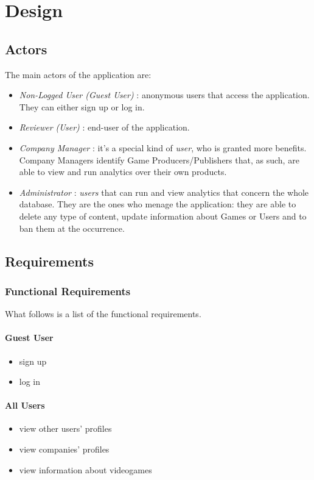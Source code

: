 \chapter{Design}
\section{Actors}
The main actors of the application are: 
\begin{itemize}
	\item \emph{Non-Logged User (Guest User)} : anonymous users that access the application. They can either sign up or log in.
	\item \emph{Reviewer (User)} : end-user of the application.
	\item \emph{Company Manager} : it's a special kind of \emph{user}, who is granted more benefits. Company Managers identify Game Producers/Publishers that, as such, are able to view and run analytics over their own products. 
	\item \emph{Administrator} : \emph{users} that can run and view analytics that concern the whole database. They are the ones who menage the application: they are able to delete any type of content, update information about Games or Users and to ban them at the occurrence. 
\end{itemize}
\section{Requirements}
\subsection{Functional Requirements}
What follows is a list of the functional requirements.
\subsubsection{Guest User}
\begin{itemize}
	\item sign up
        \item log in
\end{itemize}
\subsubsection{All Users}
\begin{itemize}
	\item view other users' profiles
	\item view companies' profiles
	\item view information about videogames
\end{itemize}
